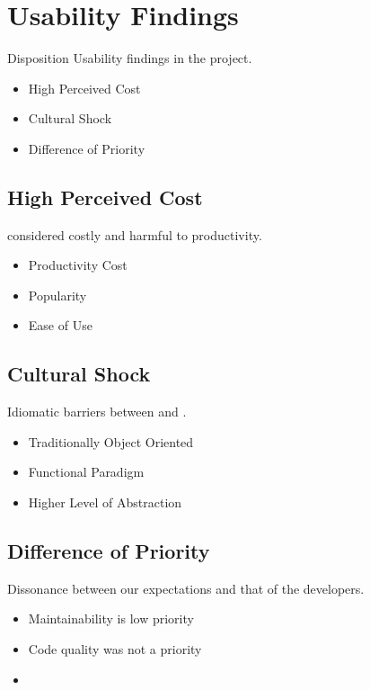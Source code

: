 \section{Usability Findings}
\begin{frame}{\secname}{Disposition}
	Usability findings in the project.
	\begin{itemize}
		\item<2-> High Perceived Cost
		\item<3-> Cultural Shock
		\item<4-> Difference of Priority
	\end{itemize}
\end{frame}

\subsection{High Perceived Cost}
\begin{frame}{\secname}{\subsecname}
	\fs considered costly and harmful to productivity.
	\begin{itemize}
		\item<2-> Productivity Cost
		\item<3-> Popularity
		\item<4-> Ease of Use
	\end{itemize}
\end{frame}

\subsection{Cultural Shock}
\begin{frame}{\secname}{\subsecname}
	Idiomatic barriers between \cs and \fs.
	\begin{itemize}
		\item<2-> Traditionally Object Oriented
		\item<3-> Functional Paradigm
		\item<4-> Higher Level of Abstraction
	\end{itemize}
\end{frame}

\subsection{Difference of Priority}
\begin{frame}{\secname}{\subsecname}
	Dissonance between our expectations and that of the developers.
	\begin{itemize}
		\item<2-> Maintainability is low priority
		\item<3-> Code quality was not a priority
		\item<4-> 
	\end{itemize}
\end{frame}

